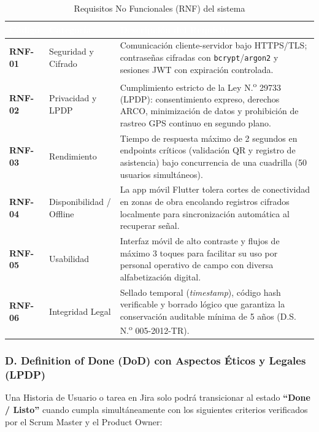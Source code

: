 \documentclass[11pt,a4paper]{article}
\begin{document}
\begin{table}[H]
\centering
\caption{Requisitos No Funcionales (RNF) del sistema}
\label{tab:rnf}
\renewcommand{\arraystretch}{1.22}
\small
\begin{tabularx}{\textwidth}{C{1.5cm} L{3.3cm} Y}
\toprule
{}
\textcolor{white}{\textbf{Código}} & \textcolor{white}{\textbf{Categoría}} & \textcolor{white}{\textbf{Descripción del Requisito}} \\
\midrule
\textbf{RNF-01} & Seguridad y Cifrado & Comunicación cliente-servidor bajo HTTPS/TLS; contraseñas cifradas con \texttt{bcrypt}/\texttt{argon2} y sesiones JWT con expiración controlada. \\
\textbf{RNF-02} & Privacidad y LPDP & Cumplimiento estricto de la Ley N.\textsuperscript{o} 29733 (LPDP): consentimiento expreso, derechos ARCO, minimización de datos y prohibición de rastreo GPS continuo en segundo plano. \\
\textbf{RNF-03} & Rendimiento & Tiempo de respuesta máximo de 2 segundos en endpoints críticos (validación QR y registro de asistencia) bajo concurrencia de una cuadrilla (50 usuarios simultáneos). \\
\textbf{RNF-04} & Disponibilidad / Offline & La app móvil Flutter tolera cortes de conectividad en zonas de obra encolando registros cifrados localmente para sincronización automática al recuperar señal. \\
\textbf{RNF-05} & Usabilidad & Interfaz móvil de alto contraste y flujos de máximo 3 toques para facilitar su uso por personal operativo de campo con diversa alfabetización digital. \\
\textbf{RNF-06} & Integridad Legal & Sellado temporal (\textit{timestamp}), código hash verificable y borrado lógico que garantiza la conservación auditable mínima de 5 años (D.S. N.\textsuperscript{o} 005-2012-TR). \\
\bottomrule
\end{tabularx}
\end{table}

\subsubsection*{D. Definition of Done (DoD) con Aspectos Éticos y Legales (LPDP)}

Una Historia de Usuario o tarea en Jira solo podrá transicionar al estado \textbf{``Done / Listo''} cuando cumpla simultáneamente con los siguientes criterios verificados por el Scrum Master y el Product Owner:
\end{document}

